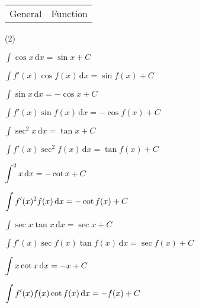 \documentclass[11pt,a4paper]{book}
\let\csc\relax
\DeclareMathOperator{\csc}{cosec}
\begin{document}
\begin{tcolorbox}[colback=blue!5, colframe=black, boxrule=.4pt, sharpish corners]

\begin{tabular}{>{\centering}p{4.5cm}>{\centering}p{10cm}}
General & Function\tabularnewline
\end{tabular}

\begin{tasks}[style=itemize,label-width=3.5ex,column-sep=-1.5cm](2)

\task  ${\displaystyle \int\cos x\, \mathrm{d}x=\sin x+C}$

\task ${\displaystyle \int f'(x)\cos f(x)\, \mathrm{d}x=\sin f(x)+C}$

\task  ${\displaystyle \int\sin x\, \mathrm{d}x=-\cos x+C}$

\task  ${\displaystyle \int f'(x)\sin f(x)\, \mathrm{d}x=-\cos f(x)+C}$

\task  ${\displaystyle \int\sec^{2}x\, \mathrm{d}x=\tan x+C}$

\task  ${\displaystyle \int f'(x)\sec^{2}f(x)\, \mathrm{d}x=\tan f(x)+C}$

\task  ${\displaystyle \int\csc^{2}x\, \mathrm{d}x=-\cot x+C}$

\task  ${\displaystyle \int f'(x)\csc^{2}f(x)\, \mathrm{d}x=-\cot f(x)+C}$

\task  ${\displaystyle \int\sec x\tan x\, \mathrm{d}x=\sec x+C}$

\task  ${\displaystyle \int f'(x)\sec f(x)\tan f(x)\, \mathrm{d}x=\sec f(x)+C}$

\task  ${\displaystyle \int\csc x\cot x\, \mathrm{d}x=-\csc x+C}$

\task  ${\displaystyle \int f'(x)\csc f(x)\cot f(x)\, \mathrm{d}x=-\csc f(x)+C}$

\end{tasks}
\end{tcolorbox}

\newpage
\end{document}

